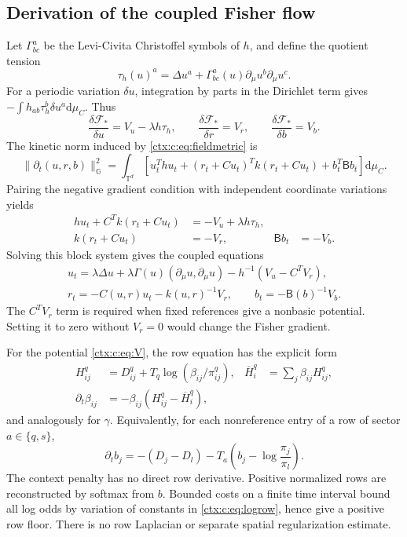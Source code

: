 \subsection{Derivation of the coupled Fisher flow}

Let $\Gamma^a_{bc}$ be the Levi-Civita Christoffel symbols of $h$, and define the quotient tension
\begin{equation}
 \tau_h(u)^a=\Delta u^a+
       \Gamma^a_{bc}(u)\partial_\mu u^b\partial_\mu u^c.
 \label{ctx:c:eq:tension}
\end{equation}
For a periodic variation $\delta u$, integration by parts in the Dirichlet term gives $-\int h_{ab}\tau_h^b\delta u^a\mathrm d\mu_C$. Thus
\begin{equation}
 \frac{\delta\mathcal F_*}{\delta u}=V_u-\lambda h\tau_h,
 \qquad \frac{\delta\mathcal F_*}{\delta r}=V_r,
 \qquad \frac{\delta\mathcal F_*}{\delta b}=V_b.
 \label{ctx:c:eq:variations}
\end{equation}
The kinetic norm induced by \cref{ctx:c:eq:fieldmetric} is
\begin{equation}
 \|\partial_t(u,r,b)\|_{\mathbb G}^2
 =\int_{\mathbb T^d}\left[u_t^Thu_t+(r_t+Cu_t)^Tk(r_t+Cu_t)+b_t^T\mathsf Bb_t\right]\mathrm d\mu_C.
 \label{ctx:c:eq:kinetic}
\end{equation}
Pairing the negative gradient condition with independent coordinate variations yields
\begin{align}
 hu_t+C^Tk(r_t+Cu_t)&=-V_u+\lambda h\tau_h,\\
 k(r_t+Cu_t)&=-V_r,& \mathsf Bb_t&=-V_b.
\end{align}
Solving this block system gives the coupled equations
\begin{align}
 \boxed{u_t=\lambda\Delta u+
 \lambda\Gamma(u)(\partial_\mu u,\partial_\mu u)
       -h^{-1}(V_u-C^TV_r),}\label{ctx:c:eq:shape}\\
 \boxed{r_t=-C(u,r)u_t-k(u,r)^{-1}V_r,\qquad
 b_t=-\mathsf B(b)^{-1}V_b.}\label{ctx:c:eq:fiber}
\end{align}
The $C^TV_r$ term is required when fixed references give a nonbasic potential. Setting it to zero without $V_r=0$ would change the Fisher gradient.

For the potential \cref{ctx:c:eq:V}, the row equation has the explicit form
\begin{align}
 H^q_{ij}&=D^q_{ij}+T_q\log(\beta_{ij}/\pi^q_{ij}),&
 \overline H^q_i&=\sum_j\beta_{ij}H^q_{ij},\\
 \partial_t\beta_{ij}&=-\beta_{ij}(H^q_{ij}-\overline H^q_i),
 \label{ctx:c:eq:row}
\end{align}
and analogously for $\gamma$. Equivalently, for each nonreference entry of a row of sector $a\in\{q,s\}$,
\begin{equation}
 \partial_t b_j=-(D_j-D_l)-T_a\left(b_j-\log\frac{\pi_j}{\pi_l}\right).
 \label{ctx:c:eq:logrow}
\end{equation}
The context penalty has no direct row derivative. Positive normalized rows are reconstructed by softmax from $b$. Bounded costs on a finite time interval bound all log odds by variation of constants in \cref{ctx:c:eq:logrow}, hence give a positive row floor. There is no row Laplacian or separate spatial regularization estimate.

